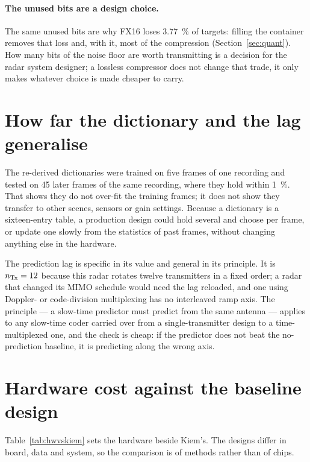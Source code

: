 \paragraph{The unused bits are a design choice.} The same unused bits are why
FX16 loses \SI{3.77}{\percent} of targets: filling the container removes that
loss and, with it, most of the compression (Section~\ref{sec:quant}). How many
bits of the noise floor are worth transmitting is a decision for the radar
system designer; a lossless compressor does not change that trade, it only
makes whatever choice is made cheaper to carry.

\section{How far the dictionary and the lag generalise}
\label{sec:generalise}

The re-derived dictionaries were trained on five frames of one recording and
tested on 45 later frames of the same recording, where they hold within
\SI{1}{\percent}. That shows they do not over-fit the training frames; it does
not show they transfer to other scenes, sensors or gain settings. Because a
dictionary is a sixteen-entry table, a production design could hold several and
choose per frame, or update one slowly from the statistics of past frames,
without changing anything else in the hardware.

The prediction lag is specific in its value and general in its principle. It
is $n_{\mathrm{Tx}} = 12$ because this radar rotates twelve transmitters in a fixed
order; a radar that changed its MIMO schedule would need the lag reloaded, and
one using Doppler- or code-division multiplexing has no interleaved ramp axis.
The principle --- a slow-time predictor must predict from the same antenna ---
applies to any slow-time coder carried over from a single-transmitter design to
a time-multiplexed one, and the check is cheap: if the predictor does not beat
the no-prediction baseline, it is predicting along the wrong axis.

\section{Hardware cost against the baseline design}
\label{sec:hwvskiem}

Table~\ref{tab:hwvskiem} sets the hardware beside Kiem's. The designs differ in
board, data and system, so the comparison is of methods rather than of chips.

